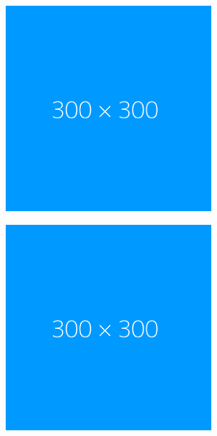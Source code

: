 \documentclass[a4paper,twoside,11pt,openright,table,draft]{article} %
\begin{document}
\begin{figure}[!htb]
	\centering
	\begin{subfigure}{0.32\textwidth}
		\centering
		\includegraphics[width=0.85\textwidth]{fig/dummy.png}
		\caption{}
	\end{subfigure}
	\begin{subfigure}{0.32\textwidth}
		\centering
		\includegraphics[width=0.85\textwidth]{fig/dummy.png}
		\caption{}
	\end{subfigure}
	\begin{subfigure}{0.32\textwidth}

\end{subfigure}
\end{figure}
\end{document}
